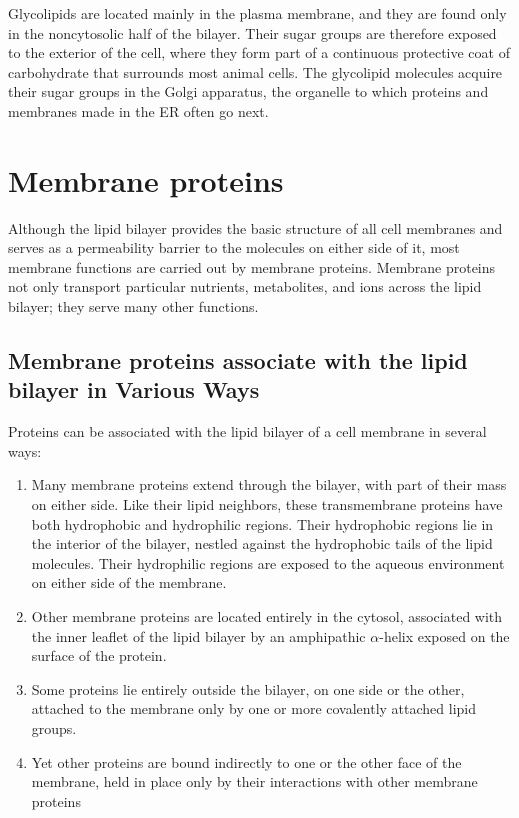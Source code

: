 Glycolipids are located mainly in the plasma membrane, and they are
found only in the noncytosolic half of the bilayer. Their sugar groups are
therefore exposed to the exterior of the cell, where they
form part of a continuous protective coat of carbohydrate that surrounds
most animal cells. The glycolipid molecules acquire their sugar groups
in the Golgi apparatus, the organelle to which proteins and membranes
made in the ER often go next.

\section{Membrane proteins}

Although the lipid bilayer provides the basic structure of all cell membranes
and serves as a permeability barrier to the molecules on either
side of it, most membrane functions are carried out by membrane proteins.
Membrane proteins not only transport particular nutrients, metabolites,
and ions across the lipid bilayer; they serve many other functions.

\subsection{Membrane proteins associate with the lipid bilayer in Various Ways}

Proteins can be associated with the lipid bilayer of a cell membrane in
several ways:

\begin{enumerate}
\item Many membrane proteins extend through the bilayer, with part of
their mass on either side. Like their lipid neighbors,
these transmembrane proteins have both hydrophobic and
hydrophilic regions. Their hydrophobic regions lie in the interior
of the bilayer, nestled against the hydrophobic tails of the lipid
molecules. Their hydrophilic regions are exposed to the aqueous
environment on either side of the membrane.
\item Other membrane proteins are located entirely in the cytosol, associated
with the inner leaflet of the lipid bilayer by an amphipathic $\alpha$-helix exposed on the surface of the protein.
\item Some proteins lie entirely outside the bilayer, on one side or the
other, attached to the membrane only by one or more covalently
attached lipid groups.
\item Yet other proteins are bound indirectly to one or the other face of
the membrane, held in place only by their interactions with other
membrane proteins
\end{enumerate}

